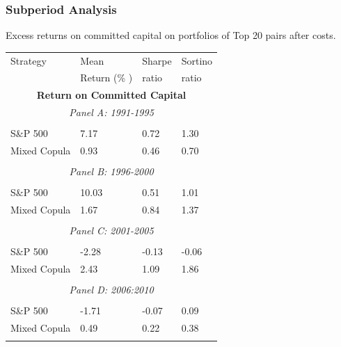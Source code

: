 \documentclass[pdf,9pt,xcolor=dvipsnames,hide notes]{beamer}
\begin{document}
\begin{frame}

\frametitle{Subperiod Analysis}
\begin{threeparttable}[H]
	\centering \tiny
	\caption{Excess returns on committed capital on portfolios of Top 20 pairs after costs. }
	\begin{tabularx}{\textwidth}{@{\extracolsep{\fill}}llll@{}}
		\toprule
		Strategy & Mean  & Sharpe & Sortino \\
		& Return (\% ) & ratio &  ratio     \\
		\midrule
		\multicolumn{4}{c}{\textbf{Return on Committed Capital}} \\
		\multicolumn{4}{c}{\textit{Panel A: 1991-1995}} \\
		&       &       &       \\
		S\&P 500 & 7.17  & 0.72  & 1.30 \\
		Mixed Copula & 0.93  & 0.46  & 0.70 \\
		\multicolumn{1}{r}{} & \multicolumn{1}{r}{} & \multicolumn{1}{r}{} & \multicolumn{1}{r}{} \\
		\multicolumn{4}{c}{\textit{Panel B: 1996-2000}} \\
		&       &       &       \\
		S\&P 500 & 10.03  & 0.51  & 1.01 \\
		Mixed Copula & 1.67  & 0.84  & 1.37 \\
		\multicolumn{1}{r}{} & \multicolumn{1}{r}{} & \multicolumn{1}{r}{} & \multicolumn{1}{r}{} \\
		\multicolumn{4}{c}{\textit{Panel C: 2001-2005}} \\
		&       &       &       \\
		S\&P 500 & -2.28  & \cellcolor{Melon} -0.13  & -0.06 \\
		Mixed Copula & 2.43  & \cellcolor{corn} 1.09  & 1.86 \\
		\multicolumn{1}{r}{} & \multicolumn{1}{r}{} & \multicolumn{1}{r}{} & \multicolumn{1}{r}{} \\
		\multicolumn{4}{c}{\textit{Panel D: 2006:2010}} \\
		&       &       &       \\
		S\&P 500 & -1.71  & \cellcolor{Melon} -0.07  & 0.09 \\
		Mixed Copula & 0.49  & \cellcolor{corn} 0.22  & 0.38 \\
		\multicolumn{1}{r}{} & \multicolumn{1}{r}{} & \multicolumn{1}{r}{} & \multicolumn{1}{r}{} \\

\end{tabularx}
\end{threeparttable}
\end{frame}
\end{document}
